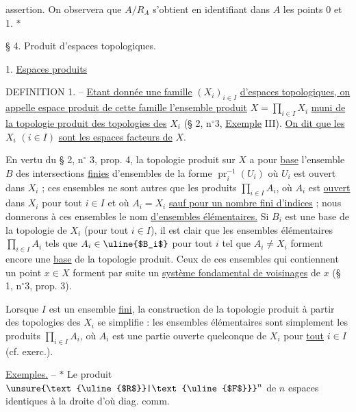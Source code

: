 assertion. On observera que $A/R_A$ s'obtient en identifiant dans $A$ les points 0 et 1. $*$

\begin{center}§ 4. Produit d'espaces topologiques.\end{center}

1. \uline{Espaces produits}

DEFINITION 1. -- \uline{Etant donnée une famille} $(X_i)_{i\in I}$ \uline{d'espaces topologiques, on appelle espace produit de cette famille l'ensemble produit} $X=\prod_{i\in I}X_i$ \uline{muni de la topologie produit des topologies des} $X_i$ (§ 2, n$^{\circ}$3, \uline{Exemple} III). \uline{On dit que les} $X_i$ $(i\in I)$ \uline{sont les espaces facteurs de} $X$.

En vertu du § 2, n$^{\circ}$ 3, prop. 4, la topologie produit sur $X$ a pour \uline{base} l'ensemble \uline{$B$} des intersections \uline{finies} d'ensembles de la forme $\operatorname{pr}_i^{-1}(U_i)$ où $U_i$ est ouvert dans $X_i$ ; ces ensembles ne sont autres que les produits $\prod_{i\in I}A_i$, où $A_i$ est \uline{ouvert} dans $X_i$ pour tout $i\in I$ et où $A_i=X_i$ \uline{sauf pour un nombre fini d'indices} ; nous donnerons à ces ensembles le nom \uline{d'ensembles élémentaires.} Si \uline{$B_i$} est une base de la topologie de $X_i$ (pour tout $i\in I$), il est clair que les ensembles élémentaires $\prod_{i\in I}A_i$ tels que $A_i\in\text{\uline{$B_i$}}$ pour tout $i$ tel que $A_i\ne X_i$ forment encore une \uline{base} de la topologie produit. Ceux de ces ensembles qui contiennent un point $x\in X$ forment par suite un \uline{système fondamental de voisinages} de $x$ (§ 1, n$^{\circ}$3, prop. 3).

Lorsque $I$ est un ensemble \uline{fini}, la construction de la topologie produit à partir des topologies des $X_i$ se simplifie : les ensembles élémentaires sont simplement les produits $\prod_{i\in I}A_i$, où $A_i$ est une partie ouverte quelconque de $X_i$ pour \uline{tout} $i\in I$ (cf. exerc.\quad).

\uline{Exemples.} -- $*$ Le produit $\unsure{\text{\uline{$R$}}|\text{\uline{$F$}}}^n$ de $n$ espaces identiques à la droite
d'où diag. comm.

